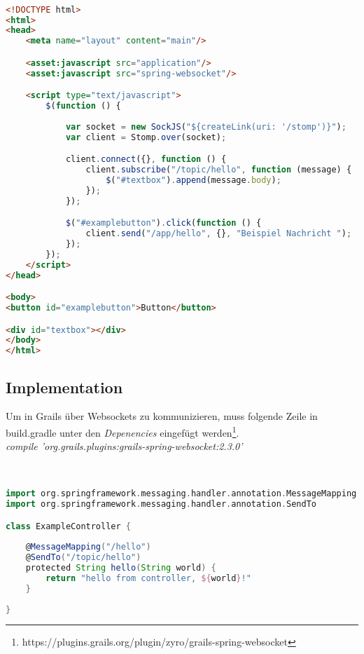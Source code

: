 \begin{lstlisting}[language=HTML,caption={GSP Code des Clients}, label=listingClient]

<!DOCTYPE html>
<html>
<head>
    <meta name="layout" content="main"/>

    <asset:javascript src="application"/>
    <asset:javascript src="spring-websocket"/>

    <script type="text/javascript">
        $(function () {
        
            var socket = new SockJS("${createLink(uri: '/stomp')}");
            var client = Stomp.over(socket);

            client.connect({}, function () {
                client.subscribe("/topic/hello", function (message) {
                    $("#textbox").append(message.body);
                });
            });

            $("#examplebutton").click(function () {
                client.send("/app/hello", {}, "Beispiel Nachricht ");
            });
        });
    </script>
</head>

<body>
<button id="examplebutton">Button</button>

<div id="textbox"></div>
</body>
</html>

\end{lstlisting}

\subsection{Implementation}

Um in Grails über Websockets zu kommunizieren, muss folgende Zeile in build.gradle unter den \textit{Depenencies} eingefügt werden\footnote{https://plugins.grails.org/plugin/zyro/grails-spring-websocket}.\\

\textit{compile 'org.grails.plugins:grails-spring-websocket:2.3.0'}\\
\\
\begin{lstlisting}[language=Groovy,caption={Beispiel der Controller Klasse}, label=listingexampleControllerClass]

import org.springframework.messaging.handler.annotation.MessageMapping
import org.springframework.messaging.handler.annotation.SendTo

class ExampleController {
	
	@MessageMapping("/hello")
	@SendTo("/topic/hello")
	protected String hello(String world) {
		return "hello from controller, ${world}!"
	}
	
}
\end{lstlisting}


